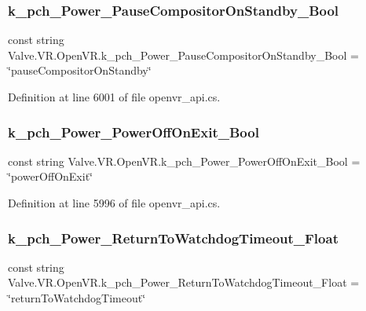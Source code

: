 \subsubsection{\texorpdfstring{k\_pch\_Power\_PauseCompositorOnStandby\_Bool}{k\_pch\_Power\_PauseCompositorOnStandby\_Bool}}
{\footnotesize\ttfamily const string Valve.\+V\+R.\+Open\+V\+R.\+k\+\_\+pch\+\_\+\+Power\+\_\+\+Pause\+Compositor\+On\+Standby\+\_\+\+Bool = \char`\"{}pause\+Compositor\+On\+Standby\char`\"{}}



Definition at line 6001 of file openvr\+\_\+api.\+cs.

\mbox{\label{class_valve_1_1_v_r_1_1_open_v_r_a65c361b824af2c10c525a370c7833d47}} 
\subsubsection{\texorpdfstring{k\_pch\_Power\_PowerOffOnExit\_Bool}{k\_pch\_Power\_PowerOffOnExit\_Bool}}
{\footnotesize\ttfamily const string Valve.\+V\+R.\+Open\+V\+R.\+k\+\_\+pch\+\_\+\+Power\+\_\+\+Power\+Off\+On\+Exit\+\_\+\+Bool = \char`\"{}power\+Off\+On\+Exit\char`\"{}}



Definition at line 5996 of file openvr\+\_\+api.\+cs.

\mbox{\label{class_valve_1_1_v_r_1_1_open_v_r_aad8e0b5e9a3b7dedc817dc3da8c65c0c}} 
\subsubsection{\texorpdfstring{k\_pch\_Power\_ReturnToWatchdogTimeout\_Float}{k\_pch\_Power\_ReturnToWatchdogTimeout\_Float}}
{\footnotesize\ttfamily const string Valve.\+V\+R.\+Open\+V\+R.\+k\+\_\+pch\+\_\+\+Power\+\_\+\+Return\+To\+Watchdog\+Timeout\+\_\+\+Float = \char`\"{}return\+To\+Watchdog\+Timeout\char`\"{}}



